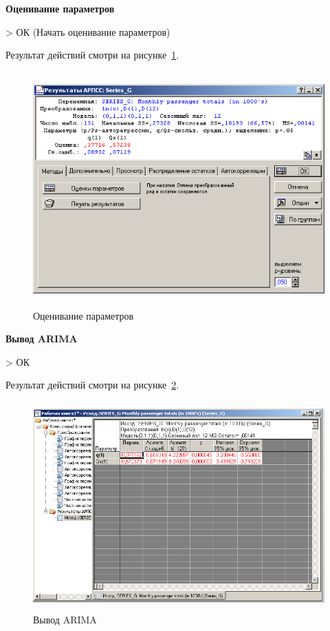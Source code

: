 \begin{center}
  \textbf{Оценивание параметров}
\end{center}

> ОК (Начать оценивание параметров)

Результат действий смотри на рисунке~\ref{fig:12}.

\begin{figure}[!h]
  \centering

  \includegraphics[height=9cm]
  {inc/Series_G/12.PNG}

  \caption{Оценивание параметров}

  \label{fig:12}
\end{figure}

\begin{center}
  \textbf{Вывод ARIMA}
\end{center}

> ОК

Результат действий смотри на рисунке~\ref{fig:13}.

\begin{figure}[!h]
  \centering

  \includegraphics[height=8cm]
  {inc/Series_G/13.PNG}

  \caption{Вывод ARIMA}

  \label{fig:13}
\end{figure}

